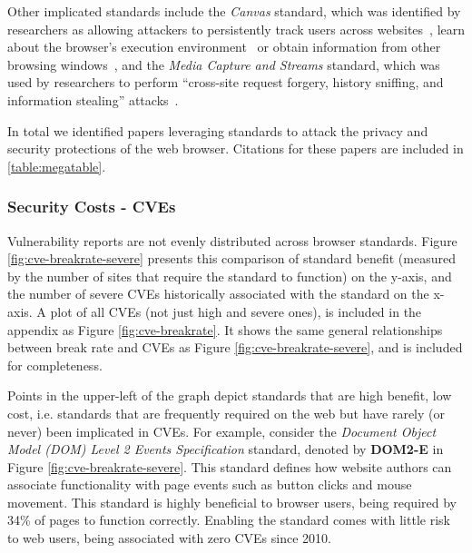 Other implicated standards include the \textit{Canvas} standard, which
was identified by researchers as allowing attackers to persistently
track users across websites~\cite{acar2014web}, learn about the browser's
execution environment~\cite{ho2014tick} or obtain information from other
browsing windows~\cite{kotcher2013cross}, and the \textit{Media Capture and Streams}
standard, which was used by researchers to perform ``cross-site request forgery, history sniffing, and information
stealing'' attacks~\cite{tian2014all}.

In total we identified \NumAttackPapers papers leveraging \NumAttackStandards
standards to attack the privacy and security protections of the web browser.
Citations for these papers are included in \ref{table:megatable}.


\subsubsection{Security Costs - CVEs}
\label{cost-benefit:results:costs-cves}




Vulnerability reports are not evenly distributed across browser standards.
Figure \ref{fig:cve-breakrate-severe} presents this comparison of
standard benefit (measured by the number of sites that require the standard
to function) on the y-axis, and the number of severe CVEs historically associated with
the standard on the x-axis.  A plot of all CVEs (not just high and severe ones),
is included in the appendix as Figure \ref{fig:cve-breakrate}.
It shows the same general relationships between break rate and CVEs as
Figure \ref{fig:cve-breakrate-severe}, and is included for completeness.

Points in the upper-left of the graph depict standards that are high benefit,
low cost, i.e. standards that are frequently required on the web but have
rarely (or never) been implicated in CVEs.  For example, consider the
\textit{Document Object Model (DOM) Level 2 Events Specification} standard,
denoted by \textbf{DOM2-E} in Figure \ref{fig:cve-breakrate-severe}.  This
standard defines how website authors can associate functionality with page
events such as button clicks and mouse movement.  This standard is highly
beneficial to browser users, being required by 34\% of pages to function
correctly.  Enabling the standard comes with little risk to web users,
being associated with zero CVEs since 2010.

